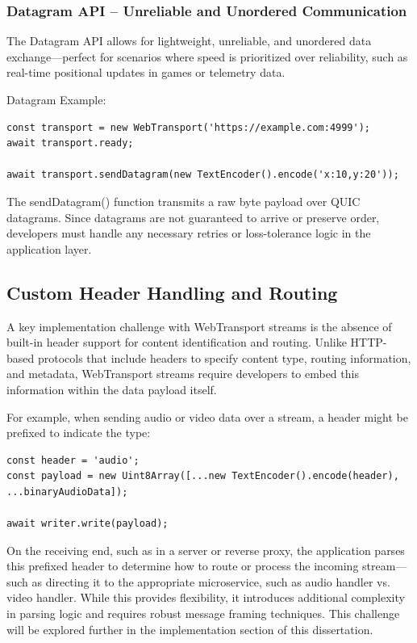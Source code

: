 \subsubsection{Datagram API – Unreliable and Unordered Communication}

The Datagram API allows for lightweight, unreliable, and unordered data exchange—perfect for scenarios where speed is prioritized over reliability, such as real-time positional updates in games or telemetry data.

Datagram Example:

\begin{verbatim}
const transport = new WebTransport('https://example.com:4999');
await transport.ready;

await transport.sendDatagram(new TextEncoder().encode('x:10,y:20'));
\end{verbatim}

The sendDatagram() function transmits a raw byte payload over QUIC datagrams. Since datagrams are not guaranteed to arrive or preserve order, developers must handle any necessary retries or loss-tolerance logic in the application layer.

\subsection{Custom Header Handling and Routing}

A key implementation challenge with WebTransport streams is the absence of built-in header support for content identification and routing. Unlike HTTP-based protocols that include headers to specify content type, routing information, and metadata, WebTransport streams require developers to embed this information within the data payload itself.

For example, when sending audio or video data over a stream, a header might be prefixed to indicate the type:

\begin{verbatim}
const header = 'audio';
const payload = new Uint8Array([...new TextEncoder().encode(header), ...binaryAudioData]);

await writer.write(payload);
\end{verbatim}

On the receiving end, such as in a server or reverse proxy, the application parses this prefixed header to determine how to route or process the incoming stream—such as directing it to the appropriate microservice, such as audio handler vs. video handler. While this provides flexibility, it introduces additional complexity in parsing logic and requires robust message framing techniques. This challenge will be explored further in the implementation section of this dissertation.

